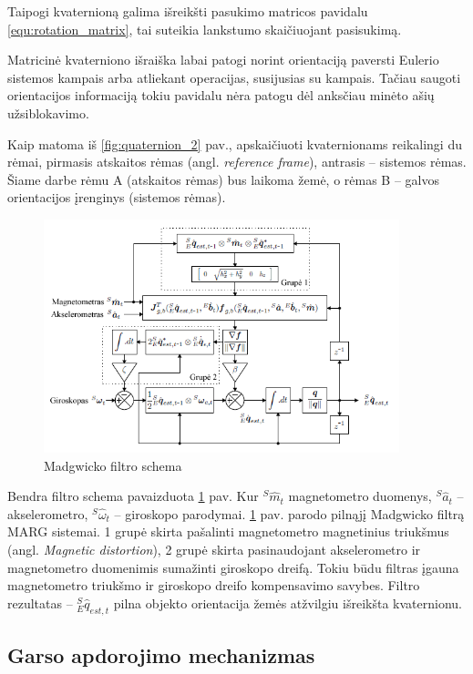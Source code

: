 \documentclass[]{vgtuef}
\begin{document}
Taipogi kvaternioną galima išreikšti pasukimo matricos pavidalu \ref{equ:rotation_matrix}, tai suteikia lankstumo skaičiuojant pasisukimą.

Matricinė kvaterniono išraiška labai patogi norint orientaciją paversti Eulerio sistemos kampais arba atliekant operacijas, susijusias su kampais. Tačiau saugoti orientacijos informaciją tokiu pavidalu nėra patogu dėl anksčiau minėto ašių užsiblokavimo. 

Kaip matoma iš \ref{fig:quaternion_2} pav., apskaičiuoti kvaternionams reikalingi du rėmai, pirmasis atskaitos rėmas (angl. \textit{reference frame}), antrasis -- sistemos rėmas. Šiame darbe rėmu A (atskaitos rėmas) bus laikoma žemė, o rėmas B – galvos orientacijos įrenginys (sistemos rėmas).

\begin{figure}[htbp]
  \centering
  \includegraphics[width=390px]{img/madgwick.png}
  \caption{Madgwicko filtro schema}
  \label{fig:madgwick}
\end{figure}

Bendra filtro schema pavaizduota \ref{fig:madgwick} pav. Kur $^{S}\hat{m}_{t}$ magnetometro duomenys, $^{S}\hat{a}_{t}$ – akselerometro, $^{S}\hat{\omega}_{t}$  – giroskopo parodymai. \ref{fig:madgwick} pav. parodo pilnąjį Madgwicko filtrą MARG sistemai. 1 grupė skirta pašalinti magnetometro magnetinius triukšmus (angl. \textit{Magnetic distortion}), 2 grupė skirta pasinaudojant akselerometro ir magnetometro duomenimis sumažinti giroskopo dreifą. Tokiu būdu filtras įgauna magnetometro triukšmo ir giroskopo dreifo kompensavimo savybes. Filtro rezultatas – $_{E}^{S}\hat{q}_{est,t}$ pilna objekto orientacija žemės atžvilgiu išreikšta kvaternionu. 

\subsection{Garso apdorojimo mechanizmas}
\end{document}
